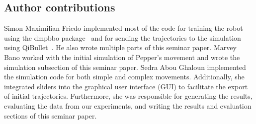 \documentclass{article}
\begin{document}
\subsection*{Author contributions}

Simon Maximilian Friedo implemented most of the code for training the robot using the dmpbbo package~\cite{stulp2019dmpbbo}
and for sending the trajectories to the simulation using QiBullet~\cite{QiBullet}.
He also wrote multiple parts of this seminar paper. \newline \newline
Marvey Bano worked with the initial simulation of Pepper's movement and wrote the simulation subsection of this seminar paper.
\newline \newline
Sedra Abou Ghaloun implemented the simulation code for both simple and complex movements. Additionally, she integrated sliders into the graphical user interface (GUI) to facilitate the export of initial trajectories. Furthermore, she was responsible for generating the results, evaluating the data from our experiments, and writing the results and evaluation sections of this seminar paper.
\newline



\end{document}
